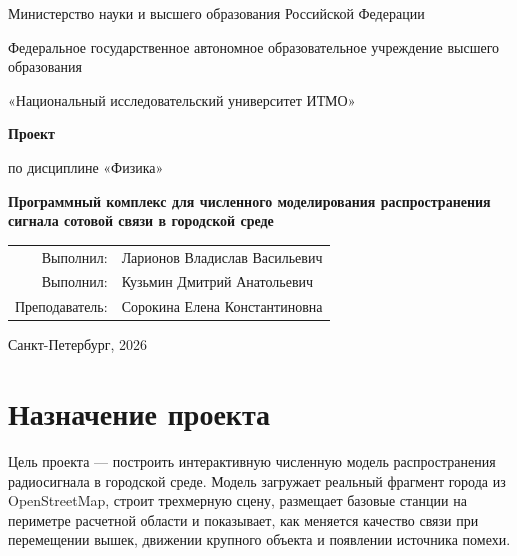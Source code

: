 \documentclass[12pt,a4paper]{article}
\begin{document}
\begin{titlepage}
    \centering

    {\small Министерство науки и высшего образования Российской Федерации\par}
    {\small Федеральное государственное автономное образовательное учреждение высшего образования\par}
    {\small «Национальный исследовательский университет ИТМО»\par}

    \vspace{3cm}

    {\Large\bfseries Проект\par}
    \vspace{0.5cm}
    {\large по дисциплине «Физика»\par}
    \vspace{0.8cm}
    {\Large\bfseries Программный комплекс для численного моделирования распространения сигнала сотовой связи в городской среде\par}

    \vfill

    \begin{flushright}
        \begin{tabular}{rl}
            Выполнил: & Ларионов Владислав Васильевич \\
            Выполнил: & Кузьмин Дмитрий Анатольевич \\
            Преподаватель: & Сорокина Елена Константиновна
        \end{tabular}
    \end{flushright}

    \vfill

    {\large Санкт-Петербург, 2026\par}
\end{titlepage}

\tableofcontents
\newpage

\section{Назначение проекта}

Цель проекта --- построить интерактивную численную модель распространения радиосигнала в городской среде. Модель загружает реальный фрагмент города из OpenStreetMap, строит трехмерную сцену, размещает базовые станции на периметре расчетной области и показывает, как меняется качество связи при перемещении вышек, движении крупного объекта и появлении источника помехи.
\end{document}

